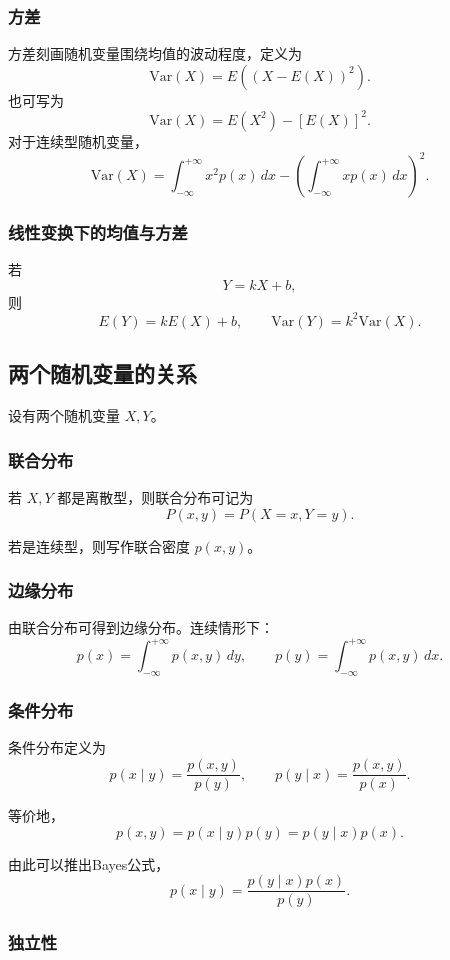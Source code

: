 \subsubsection{方差}

方差刻画随机变量围绕均值的波动程度，定义为
\[
\mathrm{Var}(X)=E\left((X-E(X))^2\right).
\]
也可写为
\[
\mathrm{Var}(X)=E(X^2)-[E(X)]^2.
\]
对于连续型随机变量，
\[
\mathrm{Var}(X)=\int_{-\infty}^{+\infty} x^2p(x)\,dx-\left(\int_{-\infty}^{+\infty} xp(x)\,dx\right)^2.
\]

\subsubsection{线性变换下的均值与方差}

若
\[
Y=kX+b,
\]
则
\[
E(Y)=kE(X)+b,
\qquad
\mathrm{Var}(Y)=k^2\mathrm{Var}(X).
\]

\subsection{两个随机变量的关系}

设有两个随机变量 \(X,Y\)。

\subsubsection{联合分布}

若 \(X,Y\) 都是离散型，则联合分布可记为
\[
P(x,y)=P(X=x,Y=y).
\]

若是连续型，则写作联合密度 \(p(x,y)\)。

\subsubsection{边缘分布}

由联合分布可得到边缘分布。连续情形下：
\[
p(x)=\int_{-\infty}^{+\infty} p(x,y)\,dy,
\qquad
p(y)=\int_{-\infty}^{+\infty} p(x,y)\,dx.
\]

\subsubsection{条件分布}

条件分布定义为
\[
p(x\mid y)=\frac{p(x,y)}{p(y)},
\qquad
p(y\mid x)=\frac{p(x,y)}{p(x)}.
\]

等价地，
\[
p(x,y)=p(x\mid y)p(y)=p(y\mid x)p(x).
\]

由此可以推出Bayes公式，
\[
p(x\mid y) = \frac{p(y \mid x)p(x)}{p(y)}.
\]

\subsubsection{独立性}

